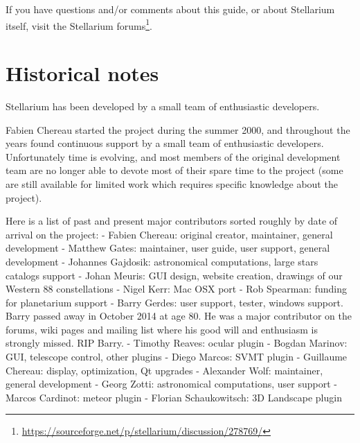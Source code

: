 If you have questions and/or comments about this guide, 
or about Stellarium itself, visit the Stellarium forums\footnote{
\url{https://sourceforge.net/p/stellarium/discussion/278769/}}.


\section{Historical notes}
\label{sec:Introduction:HistoricalNotes}



Stellarium has been developed by a small team of enthusiastic developers. 

Fabien Chereau started the project during the summer 2000, and throughout
the years found continuous support by a small team of enthusiastic developers.
Unfortunately time is evolving, and most members of the original
development team are no longer able to devote most of their spare time
to the project (some are still available for limited work
which requires specific knowledge about the project).

Here is a list of past and present major contributors sorted roughly by date of
arrival on the project:
 - Fabien Chereau: original creator, maintainer, general development
 - Matthew Gates: maintainer, user guide, user support, general development
 - Johannes Gajdosik: astronomical computations, large stars catalogs support
 - Johan Meuris: GUI design, website creation, drawings of our Western 88 constellations
 - Nigel Kerr: Mac OSX port
 - Rob Spearman: funding for planetarium support
 - Barry Gerdes: user support, tester, windows support. Barry passed away in 
     October 2014 at age 80. He was a major contributor on the forums, wiki
     pages and mailing list where his good will and enthusiasm is strongly
     missed. RIP Barry.
 - Timothy Reaves: ocular plugin
 - Bogdan Marinov: GUI, telescope control, other plugins
 - Diego Marcos: SVMT plugin
 - Guillaume Chereau: display, optimization, Qt upgrades
 - Alexander Wolf: maintainer, general development
 - Georg Zotti: astronomical computations, user support
 - Marcos Cardinot: meteor plugin
 - Florian Schaukowitsch: 3D Landscape plugin

